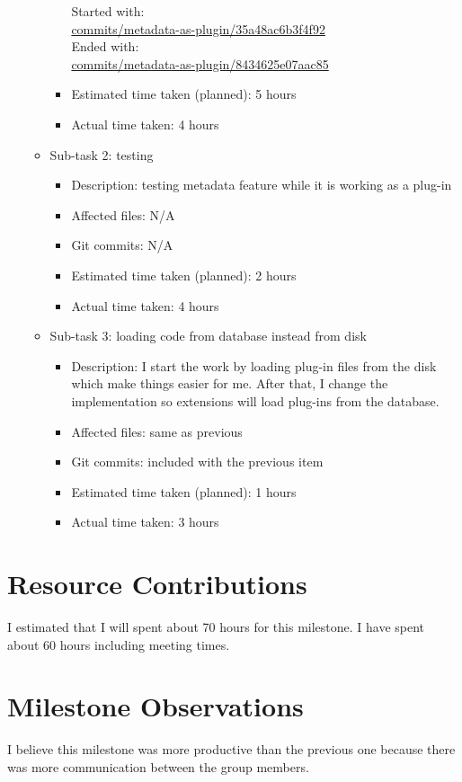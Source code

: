 \begin{itemize}
\begin{itemize}
\begin{itemize}
Started with:\\
\href{http://github.com/mfbDev/earth/commits/metadata_as_plugin/35a48ac6b3f4f92}{commits/metadata-as-plugin/35a48ac6b3f4f92}\\
Ended with:\\
\href{http://github.com/mfbDev/earth/commits/metadata_as_plugin/8434625e07aac85}{commits/metadata-as-plugin/8434625e07aac85}\\
					\item Estimated time taken (planned): 5 hours
					\item Actual time taken: 4 hours
				\end{itemize}
			\item Sub-task 2: testing
				\begin{itemize}
					\item Description: testing metadata feature while it is working as a plug-in
					\item Affected files: N/A
					\item Git commits: N/A
					\item Estimated time taken (planned): 2 hours
					\item Actual time taken: 4 hours
				\end{itemize}
			\item Sub-task 3: loading code from database instead from disk
				\begin{itemize}
					\item Description: I start the work by loading plug-in files from the disk which make things easier for me. After that, I change the implementation so extensions will load plug-ins from the database.
					\item Affected files: same as previous
					\item Git commits: included with the previous item
					\item Estimated time taken (planned): 1 hours
					\item Actual time taken: 3 hours
				\end{itemize}
		\end{itemize}
\end{itemize}

\section*{Resource Contributions}
I estimated that I will spent about 70 hours for this milestone. I have spent about 60 hours including meeting times. 


\section*{Milestone Observations}
I believe this milestone was more productive than the previous one because there was more communication between the group members.\\
